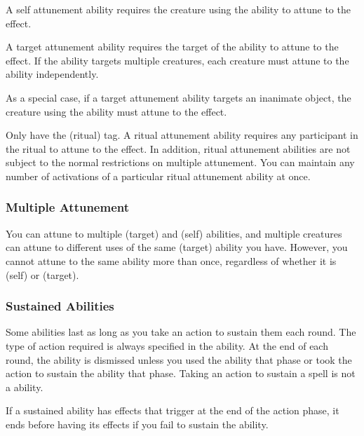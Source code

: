                 A self attunement ability requires the creature using the ability to attune to the effect.

                 A target attunement ability requires the target of the ability to attune to the effect.
                If the ability targets multiple creatures, each creature must attune to the ability independently.

                As a special case, if a target attunement ability targets an inanimate object, the creature using the ability must attune to the effect.

                 Only  have the  (ritual) tag.
                A ritual attunement ability requires any participant in the ritual to attune to the effect.
                In addition, ritual attunement abilities are not subject to the normal restrictions on multiple attunement.
                You can maintain any number of activations of a particular ritual attunement ability at once.

            \subsubsection{Multiple Attunement}
                You can attune to multiple  (target) and  (self) abilities, and multiple creatures can attune to different uses of the same  (target) ability you have.
                However, you cannot attune to the same ability more than once, regardless of whether it is  (self) or  (target).

        \subsubsection{Sustained Abilities}\label{Sustained Abilities}
            Some abilities last as long as you take an action to sustain them each round.
            The type of action required is always specified in the ability.
            At the end of each round, the ability is dismissed unless you used the ability that phase or took the action to sustain the ability that phase.
            Taking an action to sustain a spell is not a  ability.

            If a sustained ability has effects that trigger at the end of the action phase, it ends before having its effects if you fail to sustain the ability.

